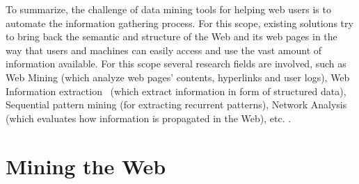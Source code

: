 To summarize, the challenge of data mining tools for helping web users is to automate the information gathering process. For this scope, existing solutions try to bring back the semantic and structure of the Web and its web pages in the way that users and machines can easily access and use the vast amount of information available. For this scope several research fields are involved, such as Web Mining \cite{Chevalier:2008}(which analyze web pages' contents, hyperlinks and user logs), Web Information extraction~\cite{Dalvi:2012} (which extract information in form of structured data), Sequential pattern mining \cite{Mooney:2013}(for extracting recurrent patterns), Network Analysis~\cite{Sun:2012} (which evaluates how information is propagated in the Web), etc. .



\color{red}
\section{Mining the Web}
\color{red}

